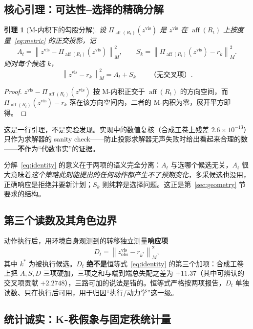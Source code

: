 \documentclass[11pt,a4paper]{ctexart}
\newtheorem{lemma}{引理}
\newcommand{\zvis}{z^{\mathrm{vis}}}
\newcommand{\Rt}{R_t}
\newcommand{\At}{A_t}
\newcommand{\Sk}{S_k}
\newcommand{\Dt}{D_t}
\newcommand{\norM}[1]{\left\lVert #1 \right\rVert_M}
\newcommand{\aff}{\operatorname{aff}}
\newcommand{\Paff}{\Pi_{\aff(\Rt)}}
\begin{document}
\subsection{核心引理：可达性--选择的精确分解}

\begin{lemma}[M-内积下的勾股分解]\label{lem:pyth}
设 $\Paff(\zvis)$ 是 $\zvis$ 在 $\aff(\Rt)$ 上按度量~\eqref{eq:metric} 的正交投影，记
\begin{equation}
  \At=\norM{\zvis-\Paff(\zvis)}^2,\qquad
  \Sk=\norM{\Paff(\zvis)-r_k}^2 .
\end{equation}
则对每个候选 $k$，
\begin{equation}
  \norM{\zvis-r_k}^2=\At+\Sk\qquad\text{（无交叉项）}.
  \label{eq:identity}
\end{equation}
\end{lemma}

\begin{proof}
$\zvis-\Paff(\zvis)$ 按 M-内积正交于 $\aff(\Rt)$ 的方向空间，而 $\Paff(\zvis)-r_k$ 落在该方向空间内，二者的 M-内积为零，展开平方即得。
\end{proof}

这是一行引理，不是实验发现。实现中的数值复核（合成工卷上残差 $2.6\times10^{-13}$）只作为求解器的 sanity check——防止投影求解器无声失败时给出看起来合理的数——\textbf{不}作为``代数事实''的证据。

分解~\eqref{eq:identity} 的意义在于两项的语义完全分离：$\At$ 与选哪个候选无关，$\At$ 很大意味着\emph{这个策略此刻能提出的任何动作都产生不了预期变化}，多采候选也没用，正确响应是拒绝并要新计划；$\Sk$ 则纯粹是选择问题。这正是第~\ref{sec:geometry} 节要求的结构。

\subsection{第三个读数及其角色边界}

动作执行后，用环境自身观测到的转移独立测量\textbf{响应项}
\begin{equation}
  \Dt=\norM{\zvis_{\mathrm{obs}}-r_{k^*}}^2 ,
\end{equation}
其中 $k^*$ 为被执行候选。$\Dt$ \textbf{绝不是}恒等式~\eqref{eq:identity} 的第三个加项：合成工卷上把 $A,S,D$ 三项硬加，三项之和与端到端总失配之差为 $+11.37$（其中可辨认的交叉项贡献 $+2.2748$），三路可加的说法是错的。恒等式严格按两项报告，$\Dt$ 单独读数、只在执行后可用，用于归因``执行/动力学''这一级。

\subsection{统计诚实：K-秩假象与固定秩统计量}\label{sec:krank}
\end{document}
